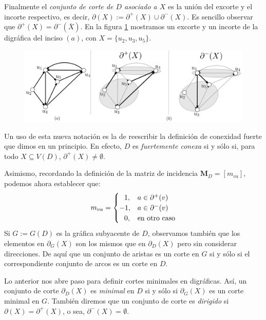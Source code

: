  Finalmente el \textit{conjunto de corte de $D$ asociado a $X$}  es la unión del excorte y el incorte respectivo, es decir, $\partial(X) := \partial^{+}(X) \cup \partial^{-}(X)$. Es sencillo observar que $\partial^{+}(X) = \partial^{-}(\overline{X})$. En la figura \ref{fig:excorteincorte} mostramos un excorte y un incorte de la digráfica del inciso $(a)$, con $X=\{u_{2},u_{3},u_{5}\}$.

 \begin{figure}[H]
    \centering
\includegraphics[scale=0.18]{img/imgchapter2/ExcorteIncorte.jpg}
    \caption{}
    \label{fig:excorteincorte}
\end{figure}
 

Un uso de esta nueva notación es la de reescribir la definición de conexidad fuerte que dimos en un principio. En efecto, $D$ es \textit{fuertemente conexa} si y sólo si, para todo $X \subseteq V(D)$, $\partial^{+}(X) \neq \emptyset$. 

Asimismo, recordando la definición de la matriz de incidencia $\mathbf{M}_{D} = [m_{va}]$, podemos ahora establecer que:
\begin{equation} \label{eq:mva}
  m_{va}=
    \begin{cases}
\hspace{0.7em} 1, & a \in \partial^{+}(v)\\ 
-1, & a \in \partial^{-}(v)\\ 
\hspace{0.7em} 0, & \text{en otro caso}
\end{cases}
\end{equation}
Si $G:=G(D)$ es la gráfica subyacente de $D$, observamos también que los elementos en $\partial_{G}(X)$ son los mismos que en $\partial_{D}(X)$ pero sin considerar direcciones. De aquí que un conjunto de aristas es un corte en $G$ si y sólo si el correspondiente conjunto de arcos es un corte en $D$.

Lo anterior nos abre paso para definir cortes minimales en digráficas. Así, un conjunto de corte $\partial_{D}(X)$ es \textit{minimal}  en $D$ si y sólo si $\partial_{G}(X)$ es un corte minimal en $G$. También diremos que un conjunto de corte es \textit{dirigido} si $\partial(X) = \partial^{+}(X)$, o sea, $\partial^{-}(X)=\emptyset$.

